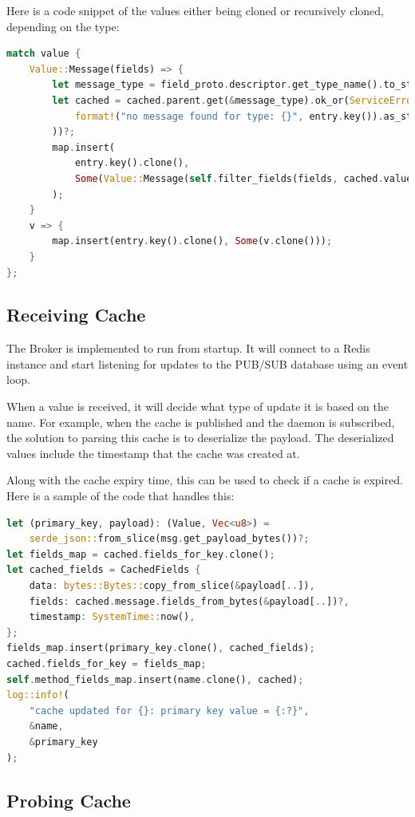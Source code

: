 \documentclass[a4paper,12pt]{report}
\begin{document}
Here is a code snippet of the values either being cloned or recursively cloned, depending on the type:

\begin{lstlisting}[language=Rust]
match value {
    Value::Message(fields) => {
        let message_type = field_proto.descriptor.get_type_name().to_string();
        let cached = cached.parent.get(&message_type).ok_or(ServiceError::new(
            format!("no message found for type: {}", entry.key()).as_str(),
        ))?;
        map.insert(
            entry.key().clone(),
            Some(Value::Message(self.filter_fields(fields, cached.value())?)),
        );
    }
    v => {
        map.insert(entry.key().clone(), Some(v.clone()));
    }
};
\end{lstlisting}

\subsection{Receiving Cache}
The Broker is implemented to run from startup. It will connect to a Redis instance and start listening for updates to the PUB/SUB database using an event loop.

When a value is received, it will decide what type of update it is based on the name. For example, when the cache is published and the daemon is subscribed, the solution to parsing this cache is to deserialize the payload. The deserialized values include the timestamp that the cache was created at. 

Along with the cache expiry time, this can be used to check if a cache is expired. Here is a sample of the code that handles this:

\begin{lstlisting}[language=Rust]
let (primary_key, payload): (Value, Vec<u8>) =
    serde_json::from_slice(msg.get_payload_bytes())?;
let fields_map = cached.fields_for_key.clone();
let cached_fields = CachedFields {
    data: bytes::Bytes::copy_from_slice(&payload[..]),
    fields: cached.message.fields_from_bytes(&payload[..])?,
    timestamp: SystemTime::now(),
};
fields_map.insert(primary_key.clone(), cached_fields);
cached.fields_for_key = fields_map;
self.method_fields_map.insert(name.clone(), cached);
log::info!(
    "cache updated for {}: primary key value = {:?}",
    &name,
    &primary_key
);
\end{lstlisting}

\subsection{Probing Cache}
\end{document}

